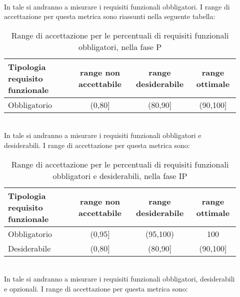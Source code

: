 					\begin{description}
					    \item[] \hfill \\
							In tale  si andranno a misurare i requisiti funzionali obbligatori. I range di accettazione per questa metrica sono riassunti nella seguente tabella:

							\begin{table}[H]
								\centering
									\begin{tabu}{| l | c | c | c |}\hline
										Tipologia requisito funzionale	&	range non accettabile & range desiderabile & range ottimale \\ \hline	\hline

										Obbligatorio   &	(0,80]& (80,90] & (90,100] \\ \hline
									\end{tabu}
									\caption{Range di accettazione per le percentuali di requisiti funzionali obbligatori, nella fase P}
							\end{table}



						\item[\insphase{Fase IP}] \hfill \\
							In tale  si andranno a misurare i requisiti funzionali obbligatori e desiderabili. I range di accettazione per questa metrica sono:
							
							\begin{table}[H]
								\centering
									\begin{tabu}{| l | c | c | c |}\hline
										Tipologia requisito funzionale	&	range non accettabile & range desiderabile & range ottimale \\ \hline	\hline

										Obbligatorio	&	(0,95]& (95,100) & 100 \\ \hline
										Desiderabile	&  (0,80]& (80,90] & (90,100] \\ \hline
									\end{tabu}
									\caption{Range di accettazione per le percentuali di requisiti funzionali obbligatori e desiderabili, nella fase IP}
							\end{table}
						
						\item[\insphase{Fase CP}] \hfill \\
							In tale  si andranno a misurare i requisiti funzionali obbligatori, desiderabili e opzionali. I range di accettazione per questa metrica sono:


\end{description}
